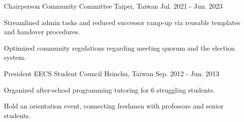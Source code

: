 

\begin{cventries}

  \cventry
    {Chairperson} %
    {Community Committee} %
    {Taipei, Taiwan} %
    {Jul. 2021 - Jun. 2023} %
    {
      \begin{cvitems} %
        \item {Streamlined admin tasks and reduced successor ramp-up
          via reusable templates and handover procedures.
        }
        \item {Optimized community regulations regarding meeting quorum and the
          election system.}
      \end{cvitems}
    }

  \cventry
    {President} %
    {EECS Student Council} %
    {Hsinchu, Taiwan} %
    {Sep. 2012 - Jun. 2013} %
    {
      \begin{cvitems} %
        \item Organized after-school programming tutoring for 6 struggling students.
        \item Hold an orientation event, connecting freshmen with professors and senior students.
      \end{cvitems}
    }

\end{cventries}
